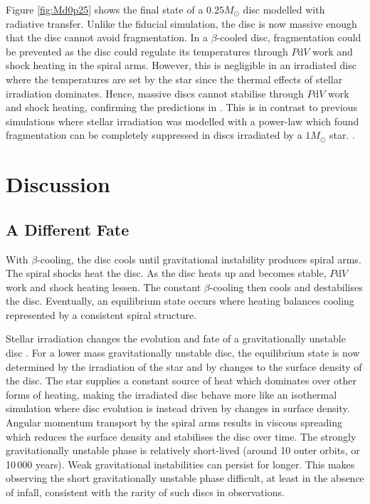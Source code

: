 \documentclass[usenatbib]{mnras}
\begin{document}
Figure \ref{fig:Md0p25} shows the final state of a $0.25M_\odot$ disc modelled with radiative transfer. Unlike the fiducial simulation, the disc is now massive enough that the disc cannot avoid fragmentation. In a $\beta$-cooled disc, fragmentation could be prevented as the disc could regulate its temperatures through $P\mathrm{d}V$ work and shock heating in the spiral arms. However, this is negligible in an irradiated disc where the temperatures are set by the star since the thermal effects of stellar irradiation dominates. Hence, massive discs cannot stabilise through $P\mathrm{d}V$ work and shock heating, confirming the predictions in \cite{2011Kratter}. This is in contrast to previous simulations where stellar irradiation was modelled with a power-law which found fragmentation can be completely suppressed in discs irradiated by a $1M_\odot$ star. \citep{2020aCadman}.

\section{Discussion}
\label{sec:Discussion}

\subsection{A Different Fate}

With $\beta$-cooling, the disc cools until gravitational instability produces spiral arms. The spiral shocks heat the disc. As the disc heats up and becomes stable, $P\mathrm{d}V$ work and shock heating lessen. The constant $\beta$-cooling then cools and destabilises the disc. Eventually, an equilibrium state occurs where heating balances cooling represented by a consistent spiral structure.

Stellar irradiation changes the evolution and fate of a gravitationally unstable disc \citep{2011Kratter,2016Kratter}. For a lower mass gravitationally unstable disc, the equilibrium state is now determined by the irradiation of the star and by changes to the surface density of the disc. The star supplies a constant source of heat which dominates over other forms of heating, making the irradiated disc behave more like an isothermal simulation \citep{2016Kratter} where disc evolution is instead driven by changes in surface density. Angular momentum transport by the spiral arms results in viscous spreading which reduces the surface density and stabilises the disc over time. The strongly gravitationally unstable phase is relatively short-lived (around 10 outer orbits, or 10\,000 years). Weak gravitational instabilities can persist for longer. This makes observing the short gravitationally unstable phase difficult, at least in the absence of infall, consistent with the rarity of such discs in observations.
\end{document}
